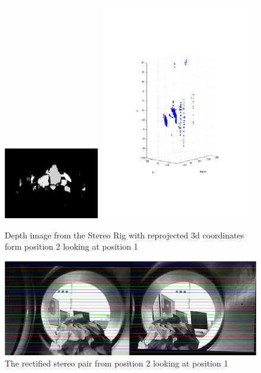 \begin{figure}[htbp]
    \centering
    \includegraphics[width=0.37\textwidth]{pics/pos2-irregular-depth}
    \includegraphics[width=0.6\textwidth]{pics/pos2-irregular-3d}
    \caption{Depth image from the Stereo Rig with reprojected 3d coordinates form position
    2 looking at position 1}
    \label{chap7:fig-pos2-irregular-depth}
\end{figure}
\begin{figure}[htbp]
    \centering
    \includegraphics[width=\textwidth]{pics/pos2-irregular-rectified}
    \caption{The rectified stereo pair from position 2 looking at position 1 }
    \label{chap7:fig-pos2-irregular-rectified}
\end{figure}



